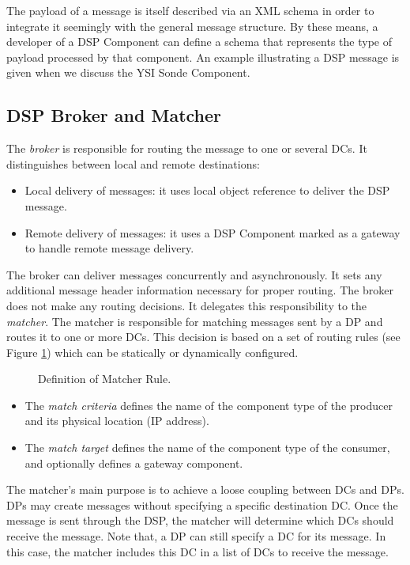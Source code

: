 \documentclass[conference]{IEEEtran}
\begin{document}
The payload of a message is itself described via an XML schema in
order to integrate it seemingly with the general message structure. By these
means, a developer of a DSP Component can define a schema that represents the
type of payload processed by that component. An example illustrating a DSP
message is given when we discuss the YSI Sonde Component.

\subsection{DSP Broker and Matcher}

The \emph{broker} is responsible for routing the message to one or
several DCs. It distinguishes between local and remote destinations:

\begin{itemize}
\item Local delivery of messages: it uses local object reference to
  deliver the DSP message.
\item Remote delivery of messages: it uses a DSP Component marked as a
  gateway to handle remote message delivery.
\end{itemize}

The broker can deliver messages concurrently and asynchronously. It
sets any additional message header information necessary for proper
routing. The broker does not make any routing decisions. It delegates
this responsibility to the \emph{matcher}. The matcher is responsible
for matching messages sent by a DP and routes it to one or more DCs.
This decision is based on a set of routing rules (see Figure
\ref{FIG_MATCHER_RULE}) which can be statically or dynamically
configured.

\begin{figure}[!htb]
 \centering
 \caption{\label{FIG_MATCHER_RULE} Definition of Matcher Rule.}
\end{figure}


\begin{itemize}
\item The \emph{match criteria} defines the name of the component type
  of the producer and its physical location (IP address).
\item The \emph{match target} defines the name of the component type
  of the consumer, and optionally defines a gateway component.
\end{itemize}

The matcher's main purpose is to achieve a loose coupling between
DCs and DPs. DPs may create messages without specifying a specific
destination DC. Once the message is sent through the DSP, the matcher will
determine which DCs should receive the message. Note that, a DP can
still specify a DC for its message. In this case, the matcher includes
this DC in a list of DCs to receive the message.
\end{document}
